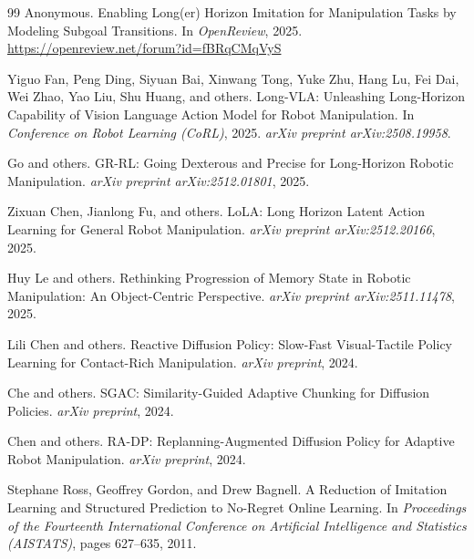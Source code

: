 \documentclass[10pt]{article}
\begin{document}
\begin{thebibliography}{99}
Anonymous.
\newblock Enabling Long(er) Horizon Imitation for Manipulation Tasks
by Modeling Subgoal Transitions.
\newblock In \emph{OpenReview}, 2025.
\newblock \url{https://openreview.net/forum?id=fBRqCMqVyS}


Yiguo Fan, Peng Ding, Siyuan Bai, Xinwang Tong, Yuke Zhu,
Hang Lu, Fei Dai, Wei Zhao, Yao Liu, Shu Huang, and others.
\newblock Long-VLA: Unleashing Long-Horizon Capability of Vision Language
Action Model for Robot Manipulation.
\newblock In \emph{Conference on Robot Learning (CoRL)}, 2025.
\newblock \emph{arXiv preprint arXiv:2508.19958}.

Go and others.
\newblock GR-RL: Going Dexterous and Precise for Long-Horizon Robotic
Manipulation.
\newblock \emph{arXiv preprint arXiv:2512.01801}, 2025.


Zixuan Chen, Jianlong Fu, and others.
\newblock LoLA: Long Horizon Latent Action Learning for General
Robot Manipulation.
\newblock \emph{arXiv preprint arXiv:2512.20166}, 2025.

Huy Le and others.
\newblock Rethinking Progression of Memory State in Robotic Manipulation:
An Object-Centric Perspective.
\newblock \emph{arXiv preprint arXiv:2511.11478}, 2025.


Lili Chen and others.
\newblock Reactive Diffusion Policy: Slow-Fast Visual-Tactile Policy Learning
for Contact-Rich Manipulation.
\newblock \emph{arXiv preprint}, 2024.

Che and others.
\newblock SGAC: Similarity-Guided Adaptive Chunking for Diffusion Policies.
\newblock \emph{arXiv preprint}, 2024.

Chen and others.
\newblock RA-DP: Replanning-Augmented Diffusion Policy for Adaptive
Robot Manipulation.
\newblock \emph{arXiv preprint}, 2024.


Stephane Ross, Geoffrey Gordon, and Drew Bagnell.
\newblock A Reduction of Imitation Learning and Structured Prediction to
No-Regret Online Learning.
\newblock In \emph{Proceedings of the Fourteenth International Conference on
Artificial Intelligence and Statistics (AISTATS)}, pages 627--635, 2011.

\end{thebibliography}
\end{document}
